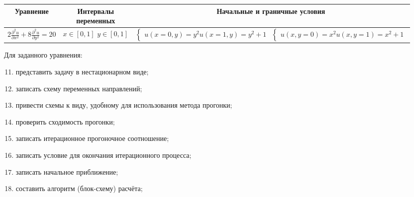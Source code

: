 \documentclass[12pt, a4paper]{report}
\begin{document}
	\begin{center}
		\begin{tabular}{||c|c|c||}
			\hline
			Уравнение & \makecell{Интервалы \\ переменных} & Начальные и граничные условия \\

			\hline
			\small 
			$ 2\frac{\partial^{2} u}{\partial x^{2}} + 8\frac{\partial^{2} u}{\partial y^{2}} = 20 $ & \makecell{$ x \in [0, 1] $ \\ $ y \in [0, 1] $} & \makecell{$\begin{cases} u(x = 0, y) = y^{2} \\ u(x = 1, y) = y^{2} + 1 \end{cases}$ \\ $\begin{cases} u(x, y = 0) = x^{2} \\ u(x, y = 1) = x^{2} + 1 \end{cases}$} \\

			\hline
		\end{tabular}
	\end{center}
	\par
	Для заданного уравнения:
	\begin{enumerate}
		\setcounter{enumi}{10}
		\item представить задачу в нестационарном виде;
		\item записать схему переменных направлений;
		\item привести схемы к виду, удобному для использования метода прогонки;
		\item проверить сходимость прогонки;
		\item записать итерационное прогоночное соотношение;
		\item записать условие для окончания итерационного процесса;
		\item записать начальное приближение;
		\item составить алгоритм (блок-схему) расчёта;
	\end{enumerate}
\end{document}

